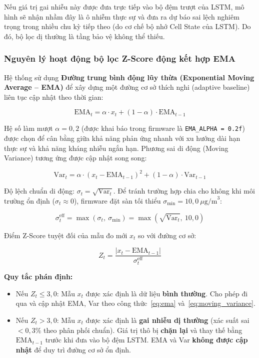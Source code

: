 \documentclass[12pt,a4paper]{article}
\begin{document}
Nếu giá trị gai nhiễu này được đưa trực tiếp vào bộ đệm trượt của LSTM, mô hình sẽ nhận nhầm đây là ô nhiễm thực sự và đưa ra dự báo sai lệch nghiêm trọng trong nhiều chu kỳ tiếp theo (do cơ chế bộ nhớ Cell State của LSTM). Do đó, bộ lọc dị thường là tầng bảo vệ không thể thiếu.

\subsubsection{Nguyên lý hoạt động bộ lọc Z-Score động kết hợp EMA}

Hệ thống sử dụng \textbf{Đường trung bình động lũy thừa (Exponential Moving Average -- EMA)} để xây dựng một đường cơ sở thích nghi (adaptive baseline) liên tục cập nhật theo thời gian:

\begin{equation}
    \text{EMA}_t = \alpha \cdot x_t + (1 - \alpha) \cdot \text{EMA}_{t-1}
    \label{eq:ema}
\end{equation}

Hệ số làm mượt $\alpha = 0{,}2$ (được khai báo trong firmware là \texttt{EMA\_ALPHA = 0.2f}) được chọn để cân bằng giữa khả năng phản ứng nhanh với xu hướng dài hạn thực sự và khả năng kháng nhiễu ngắn hạn. Phương sai di động (Moving Variance) tương ứng được cập nhật song song:

\begin{equation}
    \text{Var}_t = \alpha \cdot (x_t - \text{EMA}_{t-1})^2 + (1 - \alpha) \cdot \text{Var}_{t-1}
    \label{eq:moving_variance}
\end{equation}

Độ lệch chuẩn di động: $\sigma_t = \sqrt{\text{Var}_t}$. Để tránh trường hợp chia cho không khi môi trường ổn định ($\sigma_t \approx 0$), firmware đặt sàn tối thiểu $\sigma_{\min} = 10{,}0~\mu\text{g/m}^3$:

\begin{equation}
    \sigma_t^{\text{eff}} = \max\left(\sigma_t,\ \sigma_{\min}\right) = \max\left(\sqrt{\text{Var}_t},\ 10{,}0\right)
    \label{eq:stddev_floor}
\end{equation}

Điểm Z-Score tuyệt đối của mẫu đo mới $x_t$ so với đường cơ sở:

\begin{equation}
    Z_t = \frac{\left|x_t - \text{EMA}_{t-1}\right|}{\sigma_t^{\text{eff}}}
    \label{eq:zscore}
\end{equation}

\textbf{Quy tắc phán định:}
\begin{itemize}
    \item Nếu $Z_t \leq 3{,}0$: Mẫu $x_t$ được xác định là dữ liệu \textbf{bình thường}. Cho phép đi qua và cập nhật EMA, Var theo công thức~\eqref{eq:ema} và~\eqref{eq:moving_variance}.
    \item Nếu $Z_t > 3{,}0$: Mẫu $x_t$ được xác định là \textbf{gai nhiễu dị thường} (xác suất sai $< 0{,}3\%$ theo phân phối chuẩn). Giá trị thô bị \textbf{chặn lại} và thay thế bằng $\text{EMA}_{t-1}$ trước khi đưa vào bộ đệm LSTM. EMA và Var \textbf{không được cập nhật} để duy trì đường cơ sở ổn định.
\end{itemize}
\end{document}
